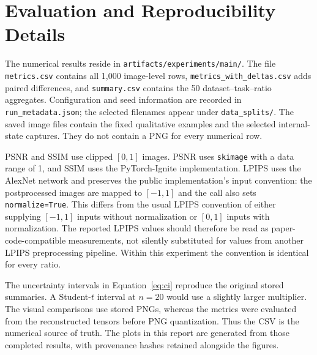 \documentclass[10pt,letterpaper]{article}
\begin{document}
\section{Evaluation and Reproducibility Details}
The numerical results reside in \texttt{artifacts/experiments/main/}. The file \texttt{metrics.csv} contains all 1,000 image-level rows, \texttt{metrics\_with\_deltas.csv} adds paired differences, and \texttt{summary.csv} contains the 50 dataset--task--ratio aggregates. Configuration and seed information are recorded in \texttt{run\_metadata.json}; the selected filenames appear under \texttt{data\_splits/}. The saved image files contain the fixed qualitative examples and the selected internal-state captures. They do not contain a PNG for every numerical row.

PSNR and SSIM use clipped $[0,1]$ images. PSNR uses \texttt{skimage} with a data range of 1, and SSIM uses the PyTorch-Ignite implementation. LPIPS uses the AlexNet network and preserves the public implementation's input convention: the postprocessed images are mapped to $[-1,1]$ and the call also sets \texttt{normalize=True}. This differs from the usual LPIPS convention of either supplying $[-1,1]$ inputs without normalization or $[0,1]$ inputs with normalization. The reported LPIPS values should therefore be read as paper-code-compatible measurements, not silently substituted for values from another LPIPS preprocessing pipeline. Within this experiment the convention is identical for every ratio.

The uncertainty intervals in Equation~\eqref{eq:ci} reproduce the original stored summaries. A Student-$t$ interval at $n=20$ would use a slightly larger multiplier. The visual comparisons use stored PNGs, whereas the metrics were evaluated from the reconstructed tensors before PNG quantization. Thus the CSV is the numerical source of truth. The plots in this report are generated from those completed results, with provenance hashes retained alongside the figures.
\end{document}
